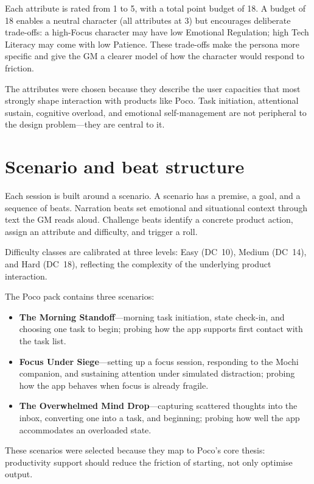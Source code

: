 \documentclass[12pt,a4paper]{report}
\begin{document}
Each attribute is rated from 1 to 5, with a total point budget of 18.
A budget of 18 enables a neutral character (all attributes at 3) but encourages
deliberate trade-offs: a high-Focus character may have low Emotional Regulation; high
Tech Literacy may come with low Patience.
These trade-offs make the persona more specific and give the GM a clearer model of how
the character would respond to friction.

The attributes were chosen because they describe the user capacities that most strongly
shape interaction with products like Poco.
Task initiation, attentional sustain, cognitive overload, and emotional self-management
are not peripheral to the design problem---they are central to it.

\section{Scenario and beat structure}

Each session is built around a scenario.
A scenario has a premise, a goal, and a sequence of beats.
Narration beats set emotional and situational context through text the GM reads aloud.
Challenge beats identify a concrete product action, assign an attribute and difficulty,
and trigger a roll.

Difficulty classes are calibrated at three levels: Easy (DC~10), Medium (DC~14), and
Hard (DC~18), reflecting the complexity of the underlying product interaction.

The Poco pack contains three scenarios:

\begin{itemize}
  \item \textbf{The Morning Standoff}---morning task initiation, state check-in, and
        choosing one task to begin; probing how the app supports first contact with the
        task list.
  \item \textbf{Focus Under Siege}---setting up a focus session, responding to the Mochi
        companion, and sustaining attention under simulated distraction; probing how the
        app behaves when focus is already fragile.
  \item \textbf{The Overwhelmed Mind Drop}---capturing scattered thoughts into the inbox,
        converting one into a task, and beginning; probing how well the app accommodates
        an overloaded state.
\end{itemize}

These scenarios were selected because they map to Poco's core thesis: productivity
support should reduce the friction of starting, not only optimise output.
\end{document}
